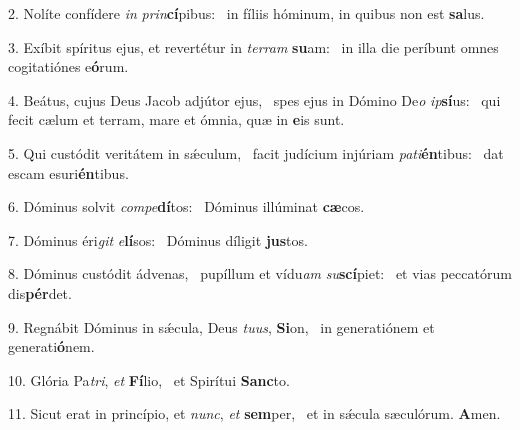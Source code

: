 2. Nolíte confídere \textit{in} \textit{prin}\textbf{cí}pibus: \ast\  in fíliis hóminum, in quibus non est \textbf{sa}lus.\

3. Exíbit spíritus ejus, et revertétur in \textit{ter}\textit{ram} \textbf{su}am: \ast\  in illa die períbunt omnes cogitatiónes e\textbf{ó}rum.\

4. Beátus, cujus Deus Jacob adjútor ejus, \dag\  spes ejus in Dómino De\textit{o} \textit{ip}\textbf{sí}us: \ast\  qui fecit cælum et terram, mare et ómnia, quæ in \textbf{e}is sunt.\

5. Qui custódit veritátem in sǽculum, \dag\  facit judícium injúriam \textit{pa}\textit{ti}\textbf{én}tibus: \ast\  dat escam esuri\textbf{én}tibus.\

6. Dóminus solvit \textit{com}\textit{pe}\textbf{dí}tos: \ast\  Dóminus illúminat \textbf{cæ}cos.\

7. Dóminus éri\textit{git} \textit{e}\textbf{lí}sos: \ast\  Dóminus díligit \textbf{jus}tos.\

8. Dóminus custódit ádvenas, \dag\  pupíllum et vídu\textit{am} \textit{su}\textbf{scí}piet: \ast\  et vias peccatórum dis\textbf{pér}det.\

9. Regnábit Dóminus in sǽcula, Deus \textit{tu}\textit{us}, \textbf{Si}on, \ast\  in generatiónem et generati\textbf{ó}nem.\

10. Glória Pa\textit{tri}, \textit{et} \textbf{Fí}lio, \ast\  et Spirítui \textbf{Sanc}to.\

11. Sicut erat in princípio, et \textit{nunc}, \textit{et} \textbf{sem}per, \ast\  et in sǽcula sæculórum. \textbf{A}men.\

